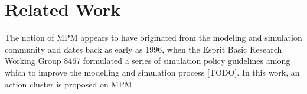 \section{Related Work}
\label{sec:RelatedWork}

The notion of MPM appears to have originated from the modeling and simulation community and dates back as early as 1996, when the Esprit Basic Research Working Group 8467 formulated a series of simulation policy guidelines among which to improve the modelling and simulation process [TODO]. In this work, an action cluster is proposed on MPM. 